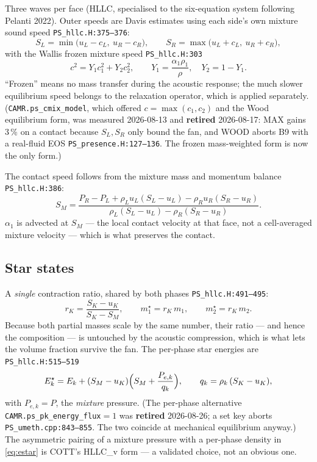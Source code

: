 \documentclass[11pt,a4paper]{article}
\newcommand{\code}[1]{\texttt{\small #1}}
\newcommand{\src}[1]{{\color{gray}\code{#1}}}
\begin{document}
Three waves per face (HLLC, specialised to the six-equation system following
Pelanti 2022).  Outer speeds are Davis estimates using each side's own mixture
sound speed \src{PS\_hllc.H:375--376}:
\begin{equation}
  S_L = \min\!\bigl(u_L-c_L,\ u_R-c_R\bigr),
  \qquad
  S_R = \max\!\bigl(u_L+c_L,\ u_R+c_R\bigr),
\end{equation}
with the Wallis frozen mixture speed \src{PS\_hllc.H:303}
\begin{equation}
  c^2 = Y_1c_1^2 + Y_2c_2^2,
  \qquad
  Y_1 = \frac{\alpha_1\rho_1}{\rho},\quad Y_2 = 1-Y_1 .
  \label{eq:cmix}
\end{equation}
``Frozen'' means no mass transfer during the acoustic response; the much
slower equilibrium speed belongs to the relaxation operator, which is applied
separately.  (\code{CAMR.ps\_cmix\_model}, which offered $c=\max(c_1,c_2)$
and the Wood equilibrium form, was measured 2026-08-13 and \textbf{retired}
2026-08-17: MAX gains 3\,\% on a contact because $S_L,S_R$ only bound the
fan, and WOOD aborts B9 with a real-fluid EOS
\src{PS\_presence.H:127--136}.  The frozen mass-weighted form is now the
only form.)

The contact speed follows from the mixture mass and momentum balance
\src{PS\_hllc.H:386}:
\begin{equation}
  S_M = \frac{P_R-P_L + \rho_Lu_L(S_L-u_L) - \rho_Ru_R(S_R-u_R)}
             {\rho_L(S_L-u_L) - \rho_R(S_R-u_R)} .
\end{equation}
$\alpha_1$ is advected at $S_M$ --- the local contact velocity at that face,
not a cell-averaged mixture velocity --- which is what preserves the contact.

\subsection{Star states}

A \emph{single} contraction ratio, shared by both phases
\src{PS\_hllc.H:491--495}:
\begin{equation}
  r_K = \frac{S_K-u_K}{S_K-S_M},
  \qquad
  m_1^\star = r_K\,m_1,
  \qquad
  m_2^\star = r_K\,m_2 .
  \label{eq:rk}
\end{equation}
Because both partial masses scale by the same number, their ratio --- and hence
the composition --- is untouched by the acoustic compression, which is what
lets the volume fraction survive the fan.  The per-phase star energies are
\src{PS\_hllc.H:515--519}
\begin{equation}
  E_k^\star = E_k + (S_M-u_K)\Bigl(S_M + \frac{P_{e,k}}{q_k}\Bigr),
  \qquad
  q_k = \rho_k\,(S_K-u_K),
  \label{eq:estar}
\end{equation}
with $P_{e,k}=P$, the \emph{mixture} pressure.  (The per-phase alternative
\code{CAMR.ps\_pk\_energy\_flux}$=1$ was \textbf{retired} 2026-08-26; a set
key aborts \src{PS\_umeth.cpp:843--855}.  The two coincide at mechanical
equilibrium anyway.)  The asymmetric pairing of a mixture pressure with a
per-phase density in \eqref{eq:estar} is COTT's HLLC\_v form --- a validated
choice, not an obvious one.
\end{document}
